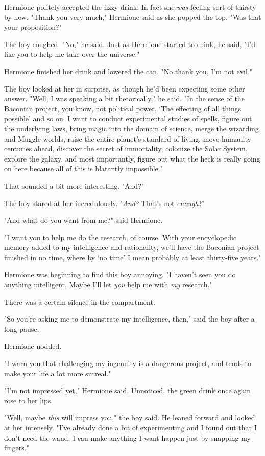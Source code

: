 Hermione politely accepted the fizzy drink. In fact she \emph{was} feeling sort
of thirsty by now. "Thank you very much," Hermione said as she popped the top.
"Was that your proposition?"

The boy coughed. "No," he said. Just as Hermione started to drink, he said,
"I'd like you to help me take over the universe."

Hermione finished her drink and lowered the can. "No thank you, I'm not evil."

The boy looked at her in surprise, as though he'd been expecting some other
answer. "Well, I was speaking a bit rhetorically," he said. "In the sense of
the Baconian project, you know, not political power. `The effecting of all
things possible' and so on. I want to conduct experimental studies of spells,
figure out the underlying laws, bring magic into the domain of science, merge
the wizarding and Muggle worlds, raise the entire planet's standard of living,
move humanity centuries ahead, discover the secret of immortality, colonize the
Solar System, explore the galaxy, and most importantly, figure out what the
heck is really going on here because all of this is blatantly impossible."

That sounded a bit more interesting. "And?"

The boy stared at her incredulously. "\emph{And?} That's not \emph{enough?}"

"And what do you want from me?" said Hermione.

"I want you to help me do the research, of course. With your encyclopedic
memory added to my intelligence and rationality, we'll have the Baconian
project finished in no time, where by `no time' I mean probably at least
thirty-five years."

Hermione was beginning to find this boy annoying. "I haven't seen you do
anything intelligent. Maybe I'll let \emph{you} help me with \emph{my}
research."

There was a certain silence in the compartment.

"So you're asking me to demonstrate my intelligence, then," said the boy after
a long pause.

Hermione nodded.

"I warn you that challenging my ingenuity is a dangerous project, and tends to
make your life a lot more surreal."

"I'm not impressed yet," Hermione said. Unnoticed, the green drink once again
rose to her lips.

"Well, maybe \emph{this} will impress you," the boy said. He leaned forward and
looked at her intensely. "I've already done a bit of experimenting and I found
out that I don't need the wand, I can make anything I want happen just by
snapping my fingers."

